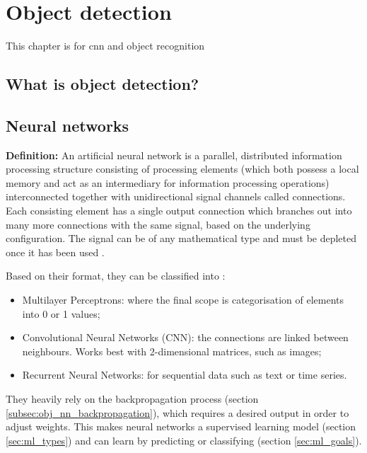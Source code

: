 \chapter{Object detection}
\label{chap:obj}

This chapter is for cnn and object recognition

\section{What is object detection?}
\label{sec:obj_what}

\qquad 

\section{Neural networks}
\label{sec:obj_nn}

\qquad \textbf{Definition:} An artificial neural network is a parallel, distributed information processing structure consisting of processing elements (which both possess a local memory and act as an intermediary for information processing operations) interconnected together with unidirectional signal channels called connections. Each consisting element has a single output connection which branches out into many more connections with the same signal, based on the underlying configuration. The signal can be of any mathematical type and must be depleted once it has been used \cite{backpropagation}.

\qquad Based on their format, they can be classified into \cite{toulouse-nn}:

\begin{itemize}
\item{Multilayer Perceptrons: where the final scope is categorisation of elements into 0 or 1 values;}
\item{Convolutional Neural Networks (CNN): the connections are linked between neighbours. Works best with 2-dimensional matrices, such as images;}
\item{Recurrent Neural Networks: for sequential data such as text or time series.}
\end{itemize}

\qquad They heavily rely on the backpropagation process (section \ref{subsec:obj_nn_backpropagation}), which requires a desired output in order to adjust weights. This makes neural networks a supervised learning model (section \ref{sec:ml_types}) and can learn by predicting or classifying (section \ref{sec:ml_goals}).

